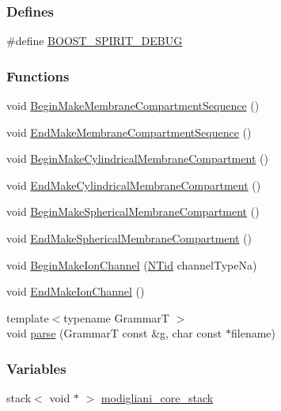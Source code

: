 \subsubsection*{Defines}
\begin{DoxyCompactItemize}
\item 
\#define \hyperlink{modigliani__model__format__grammar__t_8h_a5e5010df31ed177ba095311f3d28ee26}{BOOST\_\-SPIRIT\_\-DEBUG}
\end{DoxyCompactItemize}
\subsubsection*{Functions}
\begin{DoxyCompactItemize}
\item 
void \hyperlink{modigliani__model__format__grammar__t_8h_acb8572a24390b754dbd88ed10704af6a}{BeginMakeMembraneCompartmentSequence} ()
\item 
void \hyperlink{modigliani__model__format__grammar__t_8h_abfa56e933ef87f5bb52954f3e5aafe9c}{EndMakeMembraneCompartmentSequence} ()
\item 
void \hyperlink{modigliani__model__format__grammar__t_8h_ae9aa28e4cf834b1f1e2d4cd79b57a367}{BeginMakeCylindricalMembraneCompartment} ()
\item 
void \hyperlink{modigliani__model__format__grammar__t_8h_a3c80a46c69a68f781f7649e669eaf31f}{EndMakeCylindricalMembraneCompartment} ()
\item 
void \hyperlink{modigliani__model__format__grammar__t_8h_a9904b3a9f540e12941a5309a9b9eeb70}{BeginMakeSphericalMembraneCompartment} ()
\item 
void \hyperlink{modigliani__model__format__grammar__t_8h_a53e35fffe0793aea56659becdacc5eda}{EndMakeSphericalMembraneCompartment} ()
\item 
void \hyperlink{modigliani__model__format__grammar__t_8h_ac129161418dd239501c092acd3f2ba1b}{BeginMakeIonChannel} (\hyperlink{nt__types_8h_ab5cab5f78fdd2211c340cbe527a4afd7}{NTid} channelTypeNa)
\item 
void \hyperlink{modigliani__model__format__grammar__t_8h_aeed9ddcbf7cbe6f8a7d0dc3a223ecd93}{EndMakeIonChannel} ()
\item 
{\footnotesize template$<$typename GrammarT $>$ }\\void \hyperlink{modigliani__model__format__grammar__t_8h_a5bf233b63b1319c722c5284ffdae9103}{parse} (GrammarT const \&g, char const $\ast$filename)
\end{DoxyCompactItemize}
\subsubsection*{Variables}
\begin{DoxyCompactItemize}
\item 
stack$<$ void $\ast$ $>$ \hyperlink{modigliani__model__format__grammar__t_8h_a42bdd986e317ddaa5b9501bcd24803dd}{modigliani\_\-core\_\-stack}
\end{DoxyCompactItemize}


